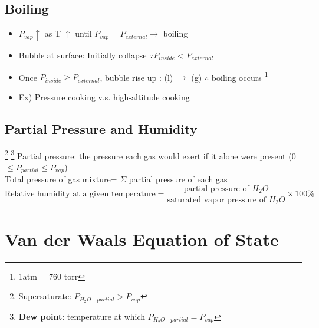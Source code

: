 \documentclass[12 pt, twoside, a4paper] {article}
\begin{document}
\subsection{Boiling}
\begin{itemize}
\item $P_{vap} \uparrow$ as T $\uparrow$ until $P_{vap} = P_{external} \rightarrow$ boiling
\item Bubble at surface: Initially collapse $\because P_{inside} < P_{external}$
\item Once $P_{inside} \geq P_{external}$, bubble rise up : (l) $\rightarrow$ (g) $\therefore$ boiling occurs \footnote{1atm = 760 torr}
\item Ex) Pressure cooking v.s. high-altitude cooking
\end{itemize}
\subsection{Partial Pressure and Humidity}
\footnote{Supersaturate: $P_{H_2O \quad partial }>P_{vap}$}
\footnote{\textbf{Dew point}: temperature at which $P_{H_2O \quad partial }=P_{vap}$}
Partial pressure: the pressure each gas would exert if it alone were present (0$\leq P_{partial} \leq P_{vap}$)
\\Total pressure of gas mixture= $\Sigma$ partial pressure of each gas
$$\text {Relative humidity at a given temperature}= \frac{\text{partial pressure of $H_2O$}}{\text{saturated vapor pressure of $H_2O$}} \times100\%$$
\section{Van der Waals Equation of State}
\end{document}
